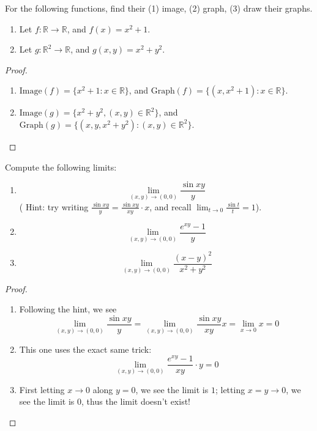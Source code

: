 \documentclass[openany]{book}
\newcommand{\R}{\mathbb{R}}
\begin{document}
\begin{prob}
    For the following functions, find their (1) image, (2) graph, (3) draw their graphs.
    \begin{enumerate}
        \item  Let $f: \R\to\R$, and $f(x)=x^2+1$.
        \item Let $g: \R^2\to \R$, and $g(x,y)=x^2+y^2$.
    \end{enumerate}
\end{prob}
\begin{proof}
    \begin{enumerate}
        \item $\text{Image}(f)=\{x^2+1: x\in\R\}$, and $\text{Graph}(f)=\{(x,x^2+1):x\in\R\}$.
        \item $\text{Image}(g)=\{x^2+y^2, (x,y)\in\R^2\}$, and $\text{Graph}(g)=\{(x,y,x^2+y^2):(x,y)\in\R^2\}$.
    \end{enumerate}
\end{proof}

\begin{prob}
    Compute the following limits:
    \begin{enumerate}
        \item \begin{equation*}
            \lim_{(x,y)\to (0,0)}\frac{\sin xy}{y}
        \end{equation*}
       ( Hint: try writing $\frac{\sin xy}{y}=\frac{\sin xy}{xy}\cdot x$, and recall $\lim_{t\to 0}\frac{\sin t}{t}=1$).
        \item \begin{equation*}
            \lim_{(x,y)\to(0,0)}\frac{e^{xy}-1}{y}
        \end{equation*}
        \item \begin{equation*}
            \lim_{(x,y)\to(0,0)}\frac{(x-y)^2}{x^2+y^2}
        \end{equation*}
    \end{enumerate}
\end{prob}
\begin{proof}
    \begin{enumerate}
        \item Following the hint, we see 
        \begin{equation*}
            \lim_{(x,y)\to(0,0)}\frac{\sin xy}{y}=\lim_{(x,y)\to(0,0)}\frac{\sin xy}{xy}x=\lim_{x\to 0}x=0
        \end{equation*}
        \item This one uses the exact same trick: \begin{equation*}
            \lim_{(x,y)\to(0,0)}\frac{e^{xy}-1}{xy}\cdot y=0
        \end{equation*}
        \item First letting $x\to 0$ along $y=0$, we see the limit is $1$; letting $x=y\to 0$, we see the limit is $0$, thus the limit doesn't exist!
    \end{enumerate}
\end{proof}
\end{document}
